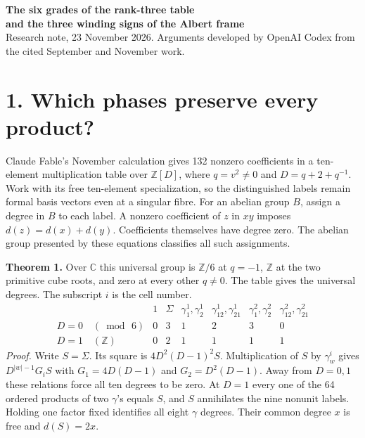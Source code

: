 \documentclass[11pt,a4paper]{article}
\newcommand{\Z}{\mathbb Z}
\newcommand{\C}{\mathbb C}
\begin{document}
\begin{center}
{\Large\bfseries The six grades of the rank-three table\\[2pt]
and the three winding signs of the Albert frame}\\[4pt]
{\small Research note, 23 November 2026. Arguments developed by OpenAI Codex from the cited September and November work.}
\end{center}

\section*{1. Which phases preserve every product?}
Claude Fable's November calculation gives 132 nonzero coefficients in a ten-element multiplication table over
$\Z[D]$, where $q=v^2\ne0$ and $D=q+2+q^{-1}$. Work with its free ten-element specialization, so the distinguished
labels remain formal basis vectors even at a singular fibre. For an abelian group $B$, assign a degree in $B$ to
each label. A nonzero coefficient of $z$ in $xy$ imposes $d(z)=d(x)+d(y)$. Coefficients themselves have degree zero.
The abelian group presented by these equations classifies all such assignments.

\textbf{Theorem 1.} Over $\C$ this universal group is $\Z/6$ at $q=-1$, $\Z$ at the two primitive cube roots,
and zero at every other $q\ne0$. The table gives the universal degrees. The subscript $i$ is the cell number.
\[
\begin{array}{c|rrrrrr}
 & 1 & \Sigma & \gamma^1_1,\gamma^1_2 & \gamma^1_{12},\gamma^1_{21}
             & \gamma^2_1,\gamma^2_2 & \gamma^2_{12},\gamma^2_{21}\\ \hline
D=0\quad(\bmod\,6)&0&3&1&2&3&0\\
D=1\quad(\Z)&0&2&1&1&1&1
\end{array}
\]
\textit{Proof.} Write $S=\Sigma$. Its square is $4D^2(D-1)^2 S$.
Multiplication of $S$ by $\gamma^i_w$ gives $D^{|w|-1}G_i S$ with
$G_1=4D(D-1)$ and $G_2=D^2(D-1)$. Away from $D=0,1$ these relations force all ten degrees to be zero.
At $D=1$ every one of the 64 ordered products of two $\gamma$'s equals $S$, and $S$ annihilates the nine nonunit
labels. Holding one factor fixed identifies all eight $\gamma$ degrees. Their common degree $x$ is free and $d(S)=2x$.
\end{document}
